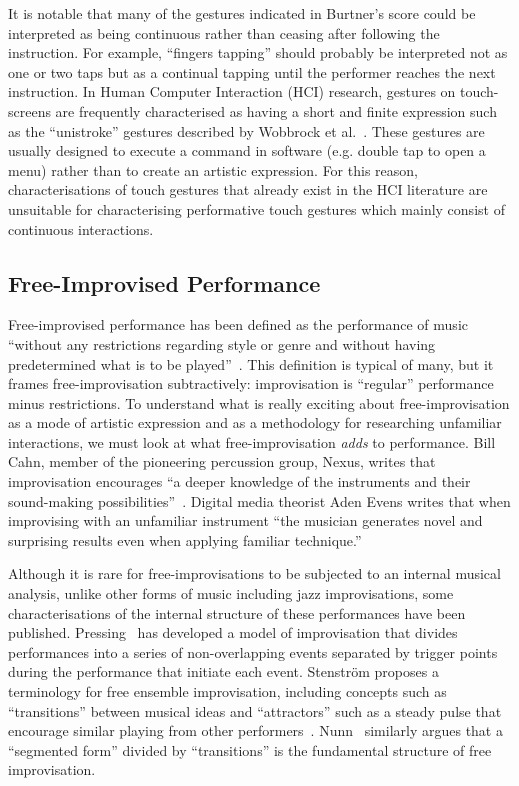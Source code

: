 \documentclass[graybox]{svmult}
\begin{document}
It is notable that many of the gestures indicated in Burtner's score
could be interpreted as being continuous rather than ceasing after 
following the instruction. For example, ``fingers tapping'' should
probably be interpreted not as one or two taps but as a continual
tapping until the performer reaches the next instruction. In Human Computer 
Interaction (HCI) 
research, gestures on touch-screens are frequently characterised as 
having a short and finite expression such as the ``unistroke''
gestures described by Wobbrock et al.~\cite{Wobbrock:2007kq}. These
gestures are usually designed to execute a command in software (e.g.
double tap to open a menu) rather than to create an artistic
expression. For this reason, characterisations of touch gestures that
already exist in the HCI literature are unsuitable for characterising
performative touch gestures which mainly consist of continuous
interactions.

\subsection{Free-Improvised Performance}
\label{subsec:free-improvisation}

Free-improvised performance has been defined as the performance of
music ``without any restrictions regarding style or genre and without
having predetermined what is to be played''~\cite{Stenstrom:2009xy}.
This definition is typical of many, but it frames
free-improvisation subtractively: improvisation is ``regular''
performance minus restrictions. To understand what is really exciting
about free-improvisation as a mode of artistic expression and as a
methodology for researching unfamiliar interactions, we must look at
what free-improvisation \emph{adds} to performance. Bill Cahn, member
of the pioneering percussion group, Nexus, writes that improvisation
encourages ``a deeper knowledge of the instruments and their
sound-making possibilities''~\cite{Cahn:2005uq}. Digital media
theorist Aden Evens writes that when improvising with an unfamiliar
instrument ``the musician generates novel and surprising results even
when applying familiar technique.''~\cite{Evens:2005kx}

Although it is rare for free-improvisations to be subjected to an
internal musical analysis, unlike other forms of music including jazz
improvisations, some characterisations of the internal structure of
these performances have been published.
Pressing~\cite{Pressing:1988uo} has developed a model of improvisation
that divides performances into a series of non-overlapping events
separated by trigger points during the performance that initiate each
event. Stenstr\"om proposes a terminology for free ensemble
improvisation, including concepts such as ``transitions'' between
musical ideas and ``attractors'' such as a steady pulse that encourage
similar playing from other performers~\cite{Stenstrom:2009xy}.
Nunn~\cite{Nunn:1998ly} similarly argues that a ``segmented form''
divided by ``transitions'' is the fundamental structure of free
improvisation.
\end{document}
